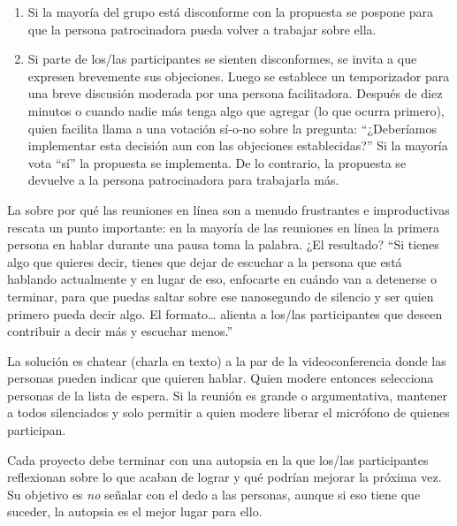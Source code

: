 \begin{enumerate}
\item
  Si la mayoría del grupo está disconforme con la propuesta
  se pospone para que la persona patrocinadora pueda volver a trabajar sobre ella.

\item
  Si parte de los/las participantes se sienten disconformes, se invita a que expresen brevemente sus objeciones.
  Luego se establece un temporizador para una breve discusión moderada por una persona facilitadora.
  Después de diez minutos o cuando nadie más tenga algo que agregar (lo que ocurra primero),
  quien facilita llama a una votación sí-o-no sobre la pregunta:
  ``¿Deberíamos implementar esta decisión aun con las objeciones establecidas?''
  Si la mayoría vota ``sí'' la propuesta se implementa.
  De lo contrario, la propuesta se devuelve a la persona patrocinadora para trabajarla más.

\end{enumerate}


La 
sobre por qué las reuniones en línea son a menudo frustrantes e improductivas 
rescata un punto importante:
en la mayoría de las reuniones en línea
la primera persona en hablar durante una pausa toma la palabra.
¿El resultado?
``Si tienes algo que quieres decir,
tienes que dejar de escuchar a la persona que está hablando actualmente
y en lugar de eso, enfocarte en cuándo van a detenerse o terminar, 
para que puedas saltar sobre ese nanosegundo de silencio y ser quien primero pueda decir algo.
El formato{\ldots} alienta a los/las participantes que deseen contribuir a decir más y escuchar menos.''

La solución es chatear (charla en texto) a la par de la videoconferencia
donde las personas pueden indicar que quieren hablar.
Quien modere entonces selecciona personas de la lista de espera.
Si la reunión es grande o argumentativa,
mantener a todos silenciados
y solo permitir a quien modere liberar el micrófono de quienes participan.


Cada proyecto debe terminar con una autopsia
en la que los/las participantes reflexionan sobre lo que acaban de lograr
y qué podrían mejorar la próxima vez.
Su objetivo es \emph{no} señalar con el dedo a las personas,
aunque si eso tiene que suceder,
la autopsia es el mejor lugar para ello.

